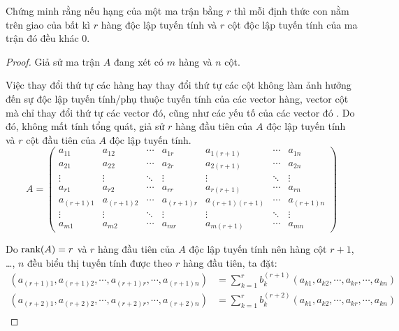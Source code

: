 \documentclass[class=linearalgebra,crop=false]{standalone}
\begin{document}
\begin{exercise}
    \par Chứng minh rằng nếu hạng của một ma trận bằng $r$ thì mỗi định thức con nằm trên giao của bất kì $r$ hàng độc lập tuyến tính và $r$ cột độc lập tuyến tính của ma trận đó đều khác 0.
\end{exercise}

\begin{proof}
    \par Giả sử ma trận $A$ đang xét có $m$ hàng và $n$ cột.
    \par Việc thay đổi thứ tự các hàng hay thay đổi thứ tự các cột không làm ảnh hưởng đến sự độc lập tuyến tính/phụ thuộc tuyến tính của các vector hàng, vector cột mà chỉ thay đổi thứ tự các vector đó, cũng như các yếu tố của các vector đó . Do đó, không mất tính tổng quát, giả sử $r$ hàng đầu tiên của $A$ độc lập tuyến tính và $r$ cột đầu tiên của $A$ độc lập tuyến tính.
    \[
        A =
        \begin{pmatrix}
            a_{11}     & a_{12}     & \cdots & a_{1r}     & a_{1(r+1)}     & \cdots & a_{1n}     \\
            a_{21}     & a_{22}     & \cdots & a_{2r}     & a_{2(r+1)}     & \cdots & a_{2n}     \\
            \vdots     & \vdots     & \ddots & \vdots     & \vdots         & \ddots & \vdots     \\
            a_{r1}     & a_{r2}     & \cdots & a_{rr}     & a_{r(r+1)}     & \cdots & a_{rn}     \\
            a_{(r+1)1} & a_{(r+1)2} & \cdots & a_{(r+1)r} & a_{(r+1)(r+1)} & \cdots & a_{(r+1)n} \\
            \vdots     & \vdots     & \ddots & \vdots     & \vdots         & \ddots & \vdots     \\
            a_{m1}     & a_{m2}     & \cdots & a_{mr}     & a_{m(r+1)}     & \cdots & a_{mn}
        \end{pmatrix}
    \]
    \par Do $\text{rank}(A) = r$ và $r$ hàng đầu tiên của $A$ độc lập tuyến tính nên hàng cột $r+1$, \ldots, $n$ đều biểu thị tuyến tính được theo $r$ hàng đầu tiên, ta đặt:
    \begin{align*}
        (a_{(r+1)1}, a_{(r+1)2}, \cdots, a_{(r+1)r}, \cdots, a_{(r+1)n}) & = \sum^{r}_{k=1}b_{k}^{(r+1)}(a_{k1}, a_{k2}, \cdots, a_{kr}, \cdots, a_{kn}) \\
        (a_{(r+2)1}, a_{(r+2)2}, \cdots, a_{(r+2)r}, \cdots, a_{(r+2)n}) & = \sum^{r}_{k=1}b_{k}^{(r+2)}(a_{k1}, a_{k2}, \cdots, a_{kr}, \cdots, a_{kn}) \\

\end{align*}
\end{proof}
\end{document}
